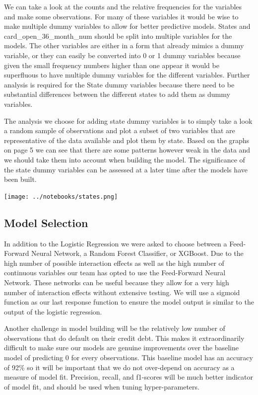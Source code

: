 \documentclass[12pt]{article}
\begin{document}
	We can take a look at the counts and the relative frequencies for the variables and make some observations. For many of these variables it would be wise 
	to make multiple dummy variables to allow for better predictive models. States and card\_open\_36\_month\_num should be split into multiple variables for the models. The other variables are either in a form that already mimics a dummy variable, or they can easily be converted into 0 or 1 dummy variables because given the small frequency numbers higher than one appear it would be superfluous to have multiple dummy variables for the different variables. Further analysis is required for the State dummy variables because there need to be substantial differences between the different states to add them as dummy variables. 
	
	The analysis we choose for adding state dummy variables is to simply take a look a random sample of observations and plot a subset of two variables that are representative of the data available and plot them by state. Based on the graphs on page 5 we can see that there are some patterns however weak in the data and we should take them into account when building the model. The significance of the state dummy variables can be assessed at a later time after the models have been built. 
	
	\begin{center}
		\texttt{[image: ../notebooks/states.png]}	
	\end{center}
	
	\subsection{Model Selection}
	
	In addition to the Logistic Regression we were asked to choose between a Feed-Forward Neural Network, a Random Forest Classifier, or XGBoost. Due to the high number of possible interaction effects as well as the high number of continuous variables our team has opted to use the Feed-Forward Neural Network. These networks can be useful because they allow for a very high number of interaction effects without extensive testing. We will use a sigmoid function as our last response function to ensure the model output is similar to the output of the logistic regression.
	
	Another challenge in model building will be the relatively low number of observations that do default on their credit debt. This makes it extraordinarily difficult to make sure our models are genuine improvements over the baseline model of predicting 0 for every observations. This baseline model has an accuracy of 92\% so it will be important that we do not over-depend on accuracy as a measure of model fit. Precision, recall, and f1-scores will be much better indicator of model fit, and should be used when tuning hyper-parameters. 
	
\end{document}
